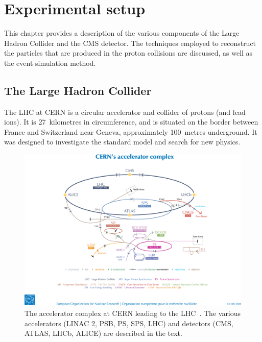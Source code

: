 \chapter{Experimental setup}
\label{chap:detector}
This chapter provides a description of the various components of the Large 
Hadron Collider and the CMS detector. The techniques employed to reconstruct 
the particles that are produced in the proton collisions are discussed, as well 
as the event simulation method.

\section{The Large Hadron Collider}
The LHC at CERN is a circular accelerator and collider of protons (and lead 
ions). It is 27~kilometres in circumference, and is situated on the border 
between France and Switzerland near Geneva, approximately 100~metres 
underground. It was designed to investigate the standard model and search for 
new physics. %

\begin{figure}
\centering
\includegraphics[width=1\textwidth, trim={2cm 5cm 2cm 1.5cm}, 
clip]{figs/detector/lhc-complex}
\caption{The accelerator complex at CERN leading to the LHC~\cite{lhc-complex}. 
The various accelerators (LINAC 2, PSB, PS, SPS, LHC) and detectors (CMS, 
ATLAS, LHCb, ALICE) are described in the text.}
\label{fig:lhc-complex}
\end{figure}

